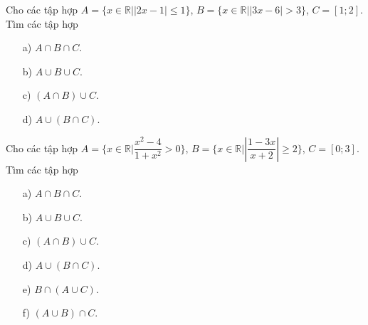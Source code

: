 \begin{bt}%
	Cho các tập hợp $A=\{x\in \mathbb{R}| \left|2x-1\right|\leq 1\}$, $B=\{x\in \mathbb{R}| \left|3x-6\right|> 3\}$, $C=[1;2]$. Tìm các tập hợp
	\begin{itemize}
		\item [a)] $A \cap B\cap C$.
		\item [b)] $A \cup B\cup C$.
		\item [c)] $(A \cap B)\cup C$.
		\item [d)] $A \cup (B \cap C)$.
	\end{itemize}
	\loigiai{
		\begin{itemize}
			\item [a)] $A \cap B\cap C = \varnothing$.
			\item [b)] $A \cup B\cup C= (-\infty;2]\cup (3;+\infty)$.
			\item [c)] $(A \cap B)\cup C=[0;2]$.
			\item [d)] $A \cup (B \cap C)=[0;1]$.
		\end{itemize}
	}
\end{bt}
\begin{bt}%
	Cho các tập hợp $A=\{x\in \mathbb{R}| \dfrac{x^2-4}{1+x^2}>0\}$, $B=\{x\in \mathbb{R}| \left|\dfrac{1-3x}{x+2}\right|\geq 2\}$, $C=[0;3]$. Tìm các tập hợp
	\begin{itemize}
		\item [a)] $A \cap B\cap C$.
		\item [b)] $A \cup B\cup C$.
		\item [c)] $(A \cap B)\cup C$.
		\item [d)] $A \cup (B \cap C)$.
		\item [e)] $B\cap (A \cup C)$.
		\item [f)] $(A \cup B) \cap C$.
	\end{itemize}
	\loigiai{
		\begin{itemize}
			\item [a)] $A \cap B\cap C=\varnothing$.
			\item [b)] $A \cup B\cup C=(-\infty;-2)\cup(-2;-\dfrac{3}{5})\cup [0;+\infty)$.
			\item [c)] $(A \cap B)\cup C = (-\infty;-2)\cup [5;+\infty)\cup [0;3]$.
			\item [d)] $A \cup (B \cap C)=(-\infty;-2)\cup (2;+\infty)$.
			\item [e)] $B\cap (A \cup C)=(-\infty;-2)\cup [5;+\infty)$.
			\item [f)] $(A \cup B) \cap C=(2;3]$.
		\end{itemize}
	}
\end{bt}



